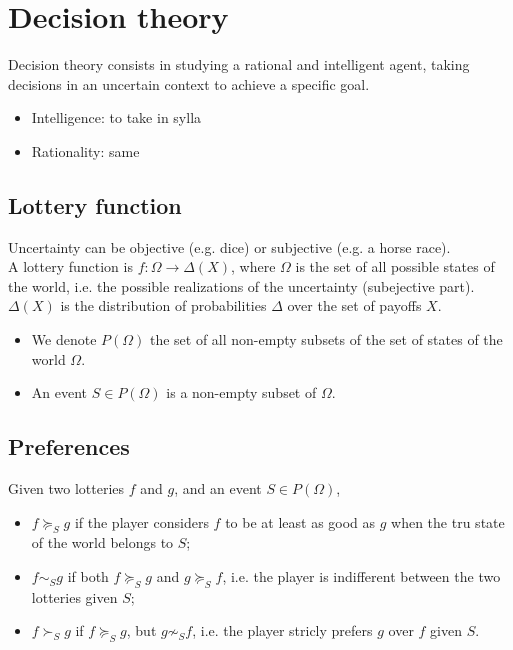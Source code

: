 \documentclass[12pt, openany]{report}
\theoremstyle{definition}
\begin{document}
\chapter{Decision theory}
Decision theory consists in studying a rational and intelligent agent, taking decisions in an uncertain context to achieve a specific goal. 
\begin{itemize}
	\item Intelligence: to take in sylla
	\item Rationality: same
\end{itemize}
\section{Lottery function}
Uncertainty can be objective (e.g. dice) or subjective (e.g. a horse race).\\
A lottery function is $f:\Omega \to \Delta(X)$, where $\Omega$ is the set of all possible states of the world, i.e. the possible realizations of the uncertainty (subejective part). $\Delta (X)$ is the distribution of probabilities $\Delta$ over the set of payoffs $X$. 
\begin{itemize}
	\item We denote $P(\Omega)$ the set of all non-empty subsets of the set of states of the world $\Omega$.
	\item An event $S\in P(\Omega)$ is a non-empty subset of $\Omega$.
\end{itemize}
\section{Preferences}
Given two lotteries $f$ and $g$, and an event $S\in P(\Omega)$, 
\begin{itemize}
	\item $f  \succcurlyeq_S g$ if the player considers $f$ to be at least as good as $g$ when the tru state of the world belongs to $S$;
	\item $f\sim_S g$ if both $f\succcurlyeq_S g$ and $g\succcurlyeq_S f$, i.e. the player is indifferent between the two lotteries given $S$;
	\item $f\succ_S g$ if $f\succcurlyeq_S g$, but $g\not \sim_S f$, i.e. the player stricly prefers $g$ over $f$ given $S$.
\end{itemize}
\end{document}
